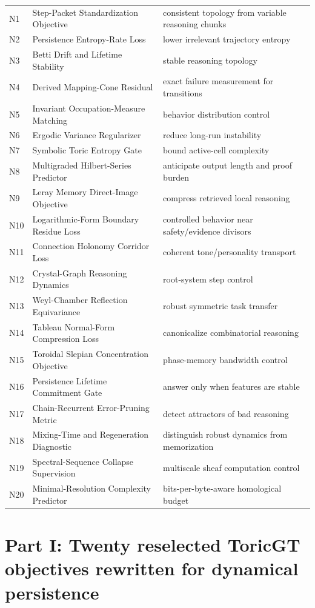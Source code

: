 \documentclass[10pt]{article}
\numberwithin{equation}{section}
\begin{document}
\begin{longtable}{p{}p{}p{}}
\midrule
N1 & Step-Packet Standardization Objective & consistent topology from variable reasoning chunks\\
N2 & Persistence Entropy-Rate Loss & lower irrelevant trajectory entropy\\
N3 & Betti Drift and Lifetime Stability & stable reasoning topology\\
N4 & Derived Mapping-Cone Residual & exact failure measurement for transitions\\
N5 & Invariant Occupation-Measure Matching & behavior distribution control\\
N6 & Ergodic Variance Regularizer & reduce long-run instability\\
N7 & Symbolic Toric Entropy Gate & bound active-cell complexity\\
N8 & Multigraded Hilbert-Series Predictor & anticipate output length and proof burden\\
N9 & Leray Memory Direct-Image Objective & compress retrieved local reasoning\\
N10 & Logarithmic-Form Boundary Residue Loss & controlled behavior near safety/evidence divisors\\
N11 & Connection Holonomy Corridor Loss & coherent tone/personality transport\\
N12 & Crystal-Graph Reasoning Dynamics & root-system step control\\
N13 & Weyl-Chamber Reflection Equivariance & robust symmetric task transfer\\
N14 & Tableau Normal-Form Compression Loss & canonicalize combinatorial reasoning\\
N15 & Toroidal Slepian Concentration Objective & phase-memory bandwidth control\\
N16 & Persistence Lifetime Commitment Gate & answer only when features are stable\\
N17 & Chain-Recurrent Error-Pruning Metric & detect attractors of bad reasoning\\
N18 & Mixing-Time and Regeneration Diagnostic & distinguish robust dynamics from memorization\\
N19 & Spectral-Sequence Collapse Supervision & multiscale sheaf computation control\\
N20 & Minimal-Resolution Complexity Predictor & bits-per-byte-aware homological budget\\
\bottomrule
\end{longtable}
\clearpage
\section{Part I: Twenty reselected ToricGT objectives rewritten for dynamical persistence}
\clearpage
\end{document}
